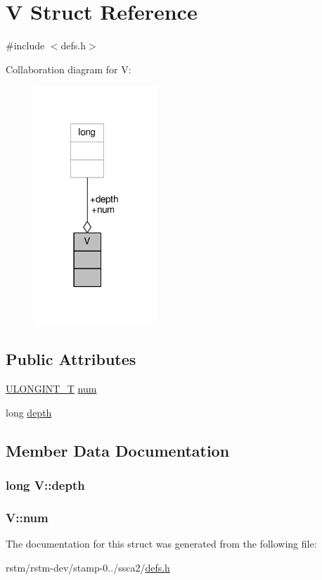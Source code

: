 \hypertarget{structV}{\section{V Struct Reference}
\label{structV}
}


{\ttfamily \#include $<$defs.\-h$>$}



Collaboration diagram for V\-:
\nopagebreak
\begin{figure}[H]
\begin{center}
\leavevmode
\includegraphics[width=131pt]{structV__coll__graph}
\end{center}
\end{figure}
\subsection*{Public Attributes}
\begin{DoxyCompactItemize}
\item 
\hyperlink{defs_8h_ade719b705ff384b386384c9385517e0b}{U\-L\-O\-N\-G\-I\-N\-T\-\_\-\-T} \hyperlink{structV_acc83a93459a68e026b85be8435a90faf}{num}
\item 
long \hyperlink{structV_a728438498f9eaa1ef240e95502206631}{depth}
\end{DoxyCompactItemize}


\subsection{Member Data Documentation}
\hypertarget{structV_a728438498f9eaa1ef240e95502206631}{
\subsubsection[{depth}]{\setlength{\rightskip}{0pt plus 5cm}long V\-::depth}}\label{structV_a728438498f9eaa1ef240e95502206631}
\hypertarget{structV_acc83a93459a68e026b85be8435a90faf}{
\subsubsection[{num}]{ V\-::num}}\label{structV_acc83a93459a68e026b85be8435a90faf}


The documentation for this struct was generated from the following file\-:\begin{DoxyCompactItemize}
\item 
rstm/rstm-\/dev/stamp-\/0../ssca2/\hyperlink{defs_8h}{defs.\-h}\end{DoxyCompactItemize}
